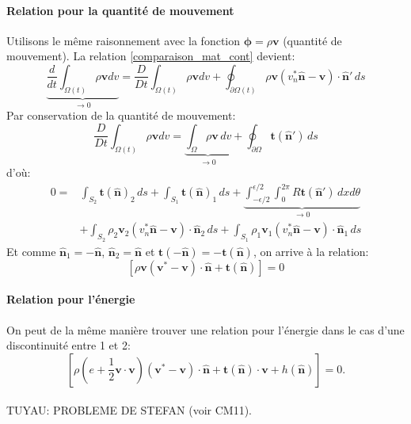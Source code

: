 \paragraph{Relation pour la quantité de mouvement}
Utilisons le même raisonnement avec la fonction $\boldsymbol{\phi}=\rho\textbf{v}$ (quantité de mouvement). La relation \ref{comparaison_mat_cont} devient:
$$\underbrace{\frac{d}{dt}\int_{\Omega (t)}\rho\textbf{v} dv}_{\rightarrow 0}=\frac{D}{Dt}\int_{\Omega (t)}\rho\textbf{v} dv+\oint_{\partial \Omega (t)}\rho\textbf{v}(v_n^*\hat{\textbf{n}}-\textbf{v})\cdot \hat{\textbf{n}}'\,ds$$
Par conservation de la quantité de mouvement:
$$\frac{D}{Dt}\int_{\Omega (t)}\rho\textbf{v} dv = \underbrace{\int_{\Omega}\rho\textbf{v}\,dv}_{\rightarrow 0}+\oint_{\partial\Omega}\textbf{t}(\hat{\textbf{n}}')\,ds$$
d'où:
\begin{align*}
0=&\int_{S_2}\textbf{t}(\hat{\textbf{n}})_2\,ds + \int_{S_1}\textbf{t}(\hat{\textbf{n}})_1\,ds + \underbrace{\int_{-\epsilon/2}^{\epsilon/2}\int_0^{2\pi}R\textbf{t} (\hat{\textbf{n}}')\,dxd\theta}_{\rightarrow 0}\\
 &+\int_{S_2}\rho_2\textbf{v}_2(v_n^*\hat{\textbf{n}}-\textbf{v})\cdot\hat{\textbf{n}}_2\,ds + \int_{S_1}\rho_1\textbf{v}_1(v_n^*\hat{\textbf{n}}-\textbf{v})\cdot\hat{\textbf{n}}_1\,ds
\end{align*}
Et comme $\hat{\textbf{n}}_1=-\hat{\textbf{n}}$, $\hat{\textbf{n}}_2=\hat{\textbf{n}}$ et $\textbf{t}(-\hat{\textbf{n}})=-\textbf{t}(\hat{\textbf{n}})$, on arrive à la relation:
$$\boxed{[\rho\textbf{v}(\textbf{v}^*-\textbf{v})\cdot\hat{\textbf{n}}+\textbf{t}(\hat{\textbf{n}})]=0}$$

\paragraph{Relation pour l'énergie}
On peut de la même manière trouver une relation pour l'énergie dans le cas d'une discontinuité entre 1 et 2:
$$\left[\rho\left(e+\frac{1}{2}\textbf{v}\cdot\textbf{v}\right)(\textbf{v}^*-\textbf{v})\cdot\hat{\textbf{n}}+\textbf{t}(\hat{\textbf{n}})\cdot\textbf{v}+h(\hat{\textbf{n}})\right]=0.$$
\paragraph{}
\vspace{3cm}
TUYAU: PROBLEME DE STEFAN (voir CM11).


